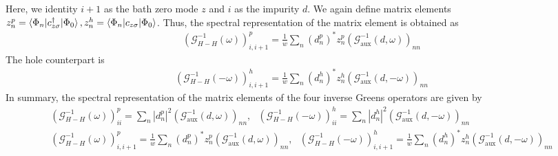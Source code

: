 \documentclass{report}
\numberwithin{equation}{section}
\begin{document}
Here, we identity \(i+1\) as the bath zero mode \(z\) and \(i\) as the impurity \(d\). We again define matrix elements \(z_n^p = \braket{\Phi_n | c^\dagger_{z\sigma} | \Phi_0}, z_n^h = \braket{\Phi_n | c_{z\sigma} | \Phi_0}\). Thus, the spectral representation of the matrix element is obtained as
\begin{equation}\begin{aligned}
	\left(\mathcal{G}^{-1}_{H-H}\left(\omega\right) \right)^p_{i,i+1} = \frac{1}{w} \sum_n \left(d^p_n\right)^* z^p_n \left(\mathcal{G}^{-1}_\text{aux}(d, \omega) \right)_{nn}
\end{aligned}\end{equation}
The hole counterpart is
\begin{equation}\begin{aligned}
	\left(\mathcal{G}^{-1}_{H-H}\left(-\omega\right) \right)^h_{i,i+1} = \frac{1}{w} \sum_n \left(d^h_n\right)^* z^h_n \left(\mathcal{G}^{-1}_\text{aux}(d, -\omega) \right)_{nn}
\end{aligned}\end{equation}
In summary, the spectral representation of the matrix elements of the four inverse Greens operators are given by
\begin{gather}
\label{green_eq_final_siam}
	\left(\mathcal{G}^{-1}_{H-H}(\omega)\right)^p_{ii} = \sum_{n} |d^p_n|^2 \left(\mathcal{G}^{-1}_\text{aux}(d, \omega)\right)_{nn}, ~ ~ ~ \left(\mathcal{G}^{-1}_{H-H}(-\omega)\right)^h_{ii} = \sum_{n} |d^h_n|^2 \left(\mathcal{G}^{-1}_\text{aux}(d, -\omega)\right)_{nn}\\
	\left(\mathcal{G}^{-1}_{H-H}\left(\omega\right) \right)^p_{i,i+1} = \frac{1}{w} \sum_n \left(d^p_n\right)^* z^p_n \left(\mathcal{G}^{-1}_\text{aux}(d, \omega) \right)_{nn}, ~ ~ ~ \left(\mathcal{G}^{-1}_{H-H}\left(-\omega\right) \right)^h_{i,i+1} = \frac{1}{w} \sum_n \left(d^h_n\right)^* z^h_n \left(\mathcal{G}^{-1}_\text{aux}(d, -\omega) \right)_{nn}
\end{gather}
\end{document}
